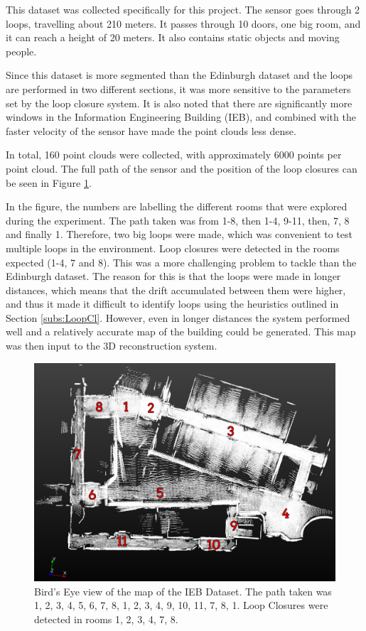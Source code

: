 \documentclass[12pt]{article}
\begin{document}
This dataset was collected specifically for this project. The sensor goes through 2 loops, travelling about 210 meters. It passes through 10 doors, one big room, and it can reach a height of 20 meters. It also contains static objects and moving people.
	
Since this dataset is more segmented than the Edinburgh dataset and the loops are performed in two different sections, it was more sensitive to the parameters set by the loop closure system. It is also noted that there are significantly more windows in the Information Engineering Building (IEB), and combined with the faster velocity of the sensor have made the point clouds less dense. 
	
In total, 160 point clouds were collected, with approximately 6000 points per point cloud. The full path of the sensor and the position of the loop closures can be seen in Figure \ref{fig:TopViewIEBDataset}.
	
In the figure, the numbers are labelling the different rooms that were explored during the experiment. The path taken was from 1-8, then 1-4, 9-11, then, 7, 8 and finally 1. Therefore, two big loops were made, which was convenient to test multiple loops in the environment. Loop closures were detected in the rooms expected (1-4, 7 and 8). This was a more challenging problem to tackle than the Edinburgh dataset. The reason for this is that the loops were made in longer distances, which means that the drift accumulated between them were higher, and thus it made it difficult to identify loops using the heuristics outlined in Section \ref{subs:LoopCl}. However, even in longer distances the system performed well and a relatively accurate map of the building could be generated. This map was then input to the 3D reconstruction system. 
	
\begin{figure}[h]
\centering
\includegraphics[width=0.8\linewidth]{Maps2/TopViewMarked}
\caption{Bird's Eye view of the map of the IEB Dataset. The path taken was 1, 2, 3, 4, 5, 6, 7, 8, 1, 2, 3, 4, 9, 10, 11, 7, 8, 1. Loop Closures were detected in rooms 1, 2, 3, 4, 7, 8.}
\label{fig:TopViewIEBDataset}
\end{figure}
\end{document}
